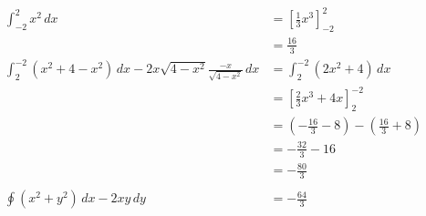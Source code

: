 \documentclass{article}
\begin{document}
\subsubsection{}

\begin{align*}
  \int_{-2}^2 x^2 \,dx                                                                 & = \left[ \frac{1}{3} x^3 \right]_{-2}^2                              \\
                                                                                       & = \frac{16}{3}                                                       \\
  \int_2^{-2} (x^2 + 4 - x^2) \,dx - 2 x \sqrt{4 - x^2} \frac{-x}{\sqrt{4 - x^2}} \,dx & = \int_2^{-2} (2 x^2 + 4) \,dx                                       \\
                                                                                       & = \left[ \frac{2}{3} x^3 + 4 x \right]_2^{-2}                        \\
                                                                                       & = \left( -\frac{16}{3} - 8 \right) - \left( \frac{16}{3} + 8 \right) \\
                                                                                       & = -\frac{32}{3} - 16                                                 \\
                                                                                       & = -\frac{80}{3}                                                      \\ \\
  \oint (x^2 + y^2) \,dx - 2 x y \,dy                                                  & = -\frac{64}{3}
\end{align*}

\setcounter{subsubsection}{20}
\subsubsection{}
\end{document}
